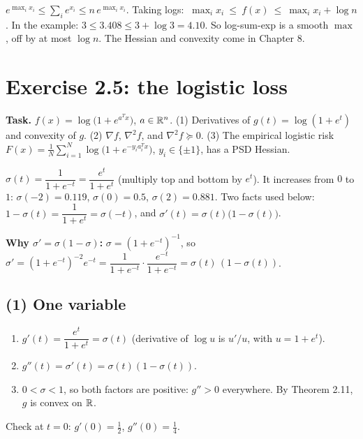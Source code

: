 \begin{intuition}
$e^{\max_ix_i}\le\sum_ie^{x_i}\le n\,e^{\max_ix_i}$. Taking logs: $\ \max_ix_i\ \le\ f(x)\ \le\ \max_ix_i+\log n$.
In the example: $3\le3.408\le3+\log3=4.10$. So log-sum-exp is a smooth $\max$, off by at most $\log n$. The Hessian and convexity come in Chapter 8.
\end{intuition}

\section{Exercise 2.5: the logistic loss \lvl{$\bullet\bullet\bullet$}}

\textbf{Task.} $f(x)=\log\big(1+e^{a^Tx}\big)$, $a\in\mathbb{R}^n$. (1) Derivatives of $g(t)=\log(1+e^t)$ and convexity of $g$. (2) $\nabla f$, $\nabla^2f$, and $\nabla^2f\succeq0$.
(3) The empirical logistic risk $F(x)=\frac1N\sum_{i=1}^N\log\big(1+e^{-y_ia_i^Tx}\big)$, $y_i\in\{\pm1\}$, has a PSD Hessian.

\begin{defn}[Sigmoid]
$\sigma(t)=\dfrac{1}{1+e^{-t}}=\dfrac{e^t}{1+e^t}$ (multiply top and bottom by $e^t$). It increases from $0$ to $1$:
$\sigma(-2)=0.119$, $\sigma(0)=0.5$, $\sigma(2)=0.881$. Two facts used below: $1-\sigma(t)=\dfrac1{1+e^t}=\sigma(-t)$, and $\sigma'(t)=\sigma(t)\big(1-\sigma(t)\big)$.
\end{defn}
\textbf{Why $\sigma'=\sigma(1-\sigma)$:} $\sigma=(1+e^{-t})^{-1}$, so $\sigma'=(1+e^{-t})^{-2}e^{-t}=\dfrac{1}{1+e^{-t}}\cdot\dfrac{e^{-t}}{1+e^{-t}}=\sigma(t)\,(1-\sigma(t))$.

\subsection*{(1) One variable}
\begin{enumerate}
  \item $g'(t)=\dfrac{e^t}{1+e^t}=\sigma(t)$ (derivative of $\log u$ is $u'/u$, with $u=1+e^t$).
  \item $g''(t)=\sigma'(t)=\sigma(t)(1-\sigma(t))$.
  \item $0<\sigma<1$, so both factors are positive: $g''>0$ everywhere. By Theorem 2.11, $g$ is convex on $\mathbb{R}$.
\end{enumerate}
Check at $t=0$: $g'(0)=\tfrac12$, $g''(0)=\tfrac14$.


